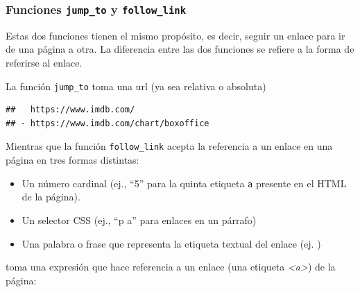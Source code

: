 \documentclass[]{article}
\newenvironment{Shaded}{\begin{snugshade}}{\end{snugshade}}
\newcommand{\KeywordTok}[1]{\textcolor[rgb]{0.13,0.29,0.53}{\textbf{#1}}}
\newcommand{\DecValTok}[1]{\textcolor[rgb]{0.00,0.00,0.81}{#1}}
\newcommand{\StringTok}[1]{\textcolor[rgb]{0.31,0.60,0.02}{#1}}
\newcommand{\OperatorTok}[1]{\textcolor[rgb]{0.81,0.36,0.00}{\textbf{#1}}}
\newcommand{\NormalTok}[1]{#1}
\providecommand{\tightlist}{%
  \setlength{\itemsep}{0pt}\setlength{\parskip}{0pt}}
\begin{document}
\subsubsection{\texorpdfstring{Funciones \texttt{jump\_to} y
\texttt{follow\_link}}{Funciones jump\_to y follow\_link}}\label{funciones-jump_to-y-follow_link}

Estas dos funciones tienen el mismo propósito, es decir, seguir un
enlace para ir de una página a otra. La diferencia entre las dos
funciones se refiere a la forma de referirse al enlace.

La función \texttt{jump\_to} toma una url (ya sea relativa o absoluta)

\begin{Shaded}
\end{Shaded}

\begin{verbatim}
##   https://www.imdb.com/
## - https://www.imdb.com/chart/boxoffice
\end{verbatim}

Mientras que la función \texttt{follow\_link} acepta la referencia a un
enlace en una página en tres formas distintas:

\begin{itemize}
\tightlist
\item
  Un número cardinal (ej., ``5'' para la quinta etiqueta \texttt{a}
  presente en el HTML de la página).
\item
  Un selector CSS (ej., ``p a'' para enlaces en un párrafo)
\item
  Una palabra o frase que representa la etiqueta textual del enlace (ej.
  )
\end{itemize}

toma una expresión que hace referencia a un enlace (una etiqueta
\emph{\textless{}a\textgreater{}}) de la página:

\begin{Shaded}
\end{Shaded}
\end{document}
